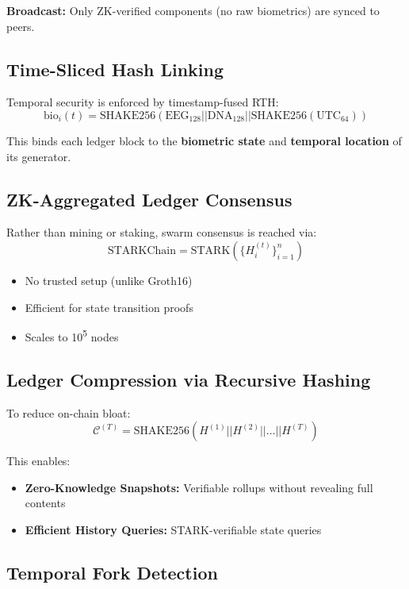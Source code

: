 \documentclass{article}
\begin{document}
\textbf{Broadcast:} Only ZK-verified components (no raw biometrics) are synced to peers.

\subsection*{Time-Sliced Hash Linking}

Temporal security is enforced by timestamp-fused RTH:
\[
\text{bio}_i(t) = \text{SHAKE256}(\text{EEG}_{128} || \text{DNA}_{128} || \text{SHAKE256}(\text{UTC}_{64}))
\]

This binds each ledger block to the \textbf{biometric state} and \textbf{temporal location} of its generator.

\subsection*{ZK-Aggregated Ledger Consensus}

Rather than mining or staking, swarm consensus is reached via:
\[
\text{STARKChain} = \text{STARK}(\{ H^{(t)}_i \}_{i=1}^{n})
\]

\begin{itemize}
    \item No trusted setup (unlike Groth16)
    \item Efficient for state transition proofs
    \item Scales to 10\textsuperscript{5} nodes
\end{itemize}

\subsection*{Ledger Compression via Recursive Hashing}

To reduce on-chain bloat:
\[
\mathcal{C}^{(T)} = \text{SHAKE256}(H^{(1)} || H^{(2)} || \dots || H^{(T)})
\]

This enables:
\begin{itemize}
    \item \textbf{Zero-Knowledge Snapshots:} Verifiable rollups without revealing full contents
    \item \textbf{Efficient History Queries:} STARK-verifiable state queries
\end{itemize}

\subsection*{Temporal Fork Detection}
\end{document}
